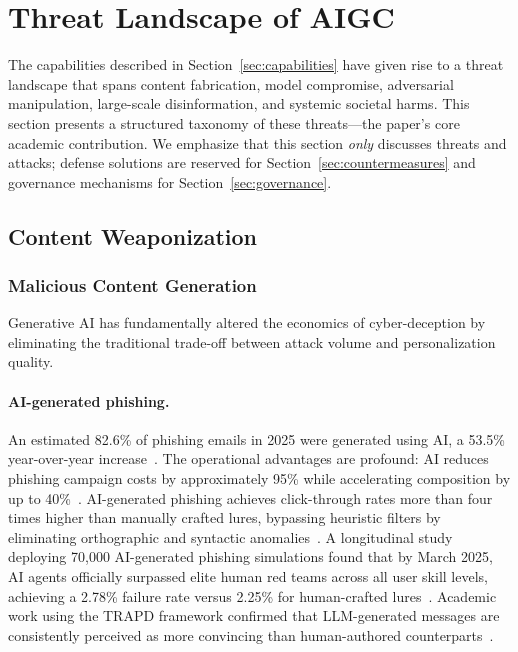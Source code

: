 
\section{Threat Landscape of AIGC}
\label{sec:threats}

The capabilities described in Section~\ref{sec:capabilities} have given rise to a threat landscape that spans content fabrication, model compromise, adversarial manipulation, large-scale disinformation, and systemic societal harms. This section presents a structured taxonomy of these threats---the paper's core academic contribution. We emphasize that this section \emph{only} discusses threats and attacks; defense solutions are reserved for Section~\ref{sec:countermeasures} and governance mechanisms for Section~\ref{sec:governance}.


\subsection{Content Weaponization}
\label{sec:threat-weapon}

\subsubsection{Malicious Content Generation}
\label{sec:threat-phishing}

Generative AI has fundamentally altered the economics of cyber-deception by eliminating the traditional trade-off between attack volume and personalization quality.

\paragraph{AI-generated phishing.}
An estimated 82.6\% of phishing emails in 2025 were generated using AI, a 53.5\% year-over-year increase~\cite{knowbe4_2025}. The operational advantages are profound: AI reduces phishing campaign costs by approximately 95\% while accelerating composition by up to 40\%~\cite{slashnext2025}. AI-generated phishing achieves click-through rates more than four times higher than manually crafted lures, bypassing heuristic filters by eliminating orthographic and syntactic anomalies~\cite{slashnext2025}. A longitudinal study deploying 70,000 AI-generated phishing simulations found that by March 2025, AI agents officially surpassed elite human red teams across all user skill levels, achieving a 2.78\% failure rate versus 2.25\% for human-crafted lures~\cite{hoxhunt2025}. Academic work using the TRAPD framework confirmed that LLM-generated messages are consistently perceived as more convincing than human-authored counterparts~\cite{trapd2024}.

